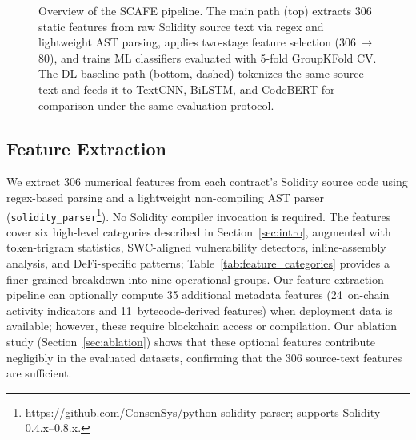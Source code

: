 \documentclass[11pt,a4paper]{article}
\newcommand{\MethodName}{SCAFE\xspace}
\begin{document}
\begin{figure}[t]
{%
}
\caption{Overview of the \MethodName pipeline. The main path (top) extracts 306 static features from raw Solidity source text via regex and lightweight AST parsing, applies two-stage feature selection (306\,$\to$\,80), and trains ML classifiers evaluated with 5-fold GroupKFold CV. The DL baseline path (bottom, dashed) tokenizes the same source text and feeds it to TextCNN, BiLSTM, and CodeBERT for comparison under the same evaluation protocol.}
\label{fig:pipeline}
\end{figure}

\subsection{Feature Extraction}
\label{sec:features}

We extract 306 numerical features from each contract's Solidity source code using regex-based parsing and a lightweight non-compiling AST parser (\texttt{solidity\_parser}\footnote{\url{https://github.com/ConsenSys/python-solidity-parser}; supports Solidity 0.4.x--0.8.x.}).
No Solidity compiler invocation is required.
The features cover six high-level categories described in Section~\ref{sec:intro}, augmented with token-trigram statistics, SWC-aligned vulnerability detectors, inline-assembly analysis, and DeFi-specific patterns; Table~\ref{tab:feature_categories} provides a finer-grained breakdown into nine operational groups.
Our feature extraction pipeline can optionally compute 35 additional metadata features (24~on-chain activity indicators and 11~bytecode-derived features) when deployment data is available; however, these require blockchain access or compilation.
Our ablation study (Section~\ref{sec:ablation}) shows that these optional features contribute negligibly in the evaluated datasets, confirming that the 306 source-text features are sufficient.
\end{document}
